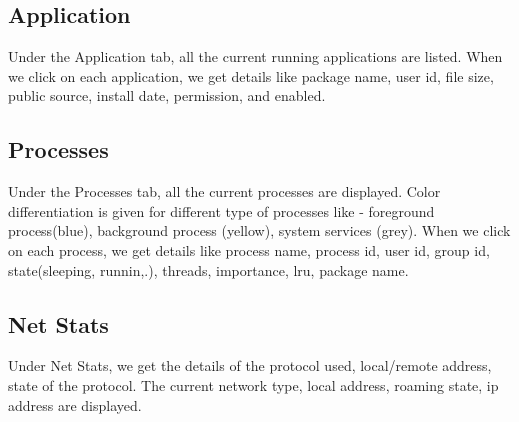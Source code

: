 \subsection{Application}	
Under the Application tab, all the current running applications are
listed.  When we click on each application, we get details like
package name, user id, file size, public source, install date,
permission,  and enabled.

\subsection{Processes}
Under the Processes tab, all the current processes are
displayed. Color differentiation is given for different type of
processes like - foreground process(blue), background process (yellow),
system services (grey).  When we click on each process, we get details
like process name, process id, user id, group id, state(sleeping,
runnin,.), threads, importance, lru, package name.

\subsection{Net Stats}
Under Net Stats, we get the details of the protocol used, local/remote
address, state of the protocol.  The current network type, local
address, roaming state, ip address are displayed.



   
